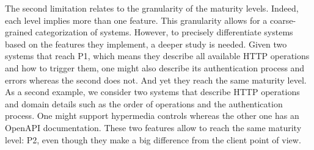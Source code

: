 The second limitation relates to the granularity of the maturity levels. Indeed, each level implies more than one feature. This granularity allows for a coarse-grained categorization of systems. However, to precisely differentiate systems based on the features they implement, a deeper study is needed. Given two systems that reach P1, which means they describe all available HTTP operations and how to trigger them, one might also describe its authentication process and errors whereas the second does not. And yet they reach the same maturity level. As a second example, we consider two systems that describe HTTP operations and domain details such as the order of operations and the authentication process. One might support hypermedia controls whereas the other one has an OpenAPI documentation. These two features allow to reach the same maturity level: P2, even though they make a big difference from the client point of view.
